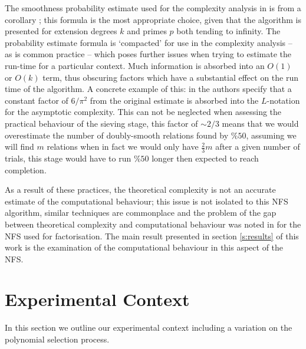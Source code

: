 \documentclass[a4paper, 10pt, envcountsect, runningheads]{lms}
\numberwithin{figure}{section}
\numberwithin{equation}{section}
\begin{document}
The smoothness probability estimate used for the complexity analysis in \cite{joux-lercier-smart-vercauteren06} is from a corollary \cite[page 15]{can-er-pom}; this formula is the most appropriate choice, given that the algorithm is presented for extension degrees $k$ and primes $p$ both tending to infinity. The probability estimate formula is `compacted' for use in the complexity analysis -- as is common practice -- which poses further issues when trying to estimate the run-time for a particular context. Much information is absorbed into an $O(1)$ or $O(k)$ term, thus obscuring factors which have a substantial effect on the run time of the algorithm. A concrete example of this: in \cite{joux-lercier-smart-vercauteren06} the authors specify that a constant factor of $6/\pi^2$ from the original estimate is absorbed into the $L$-notation for the asymptotic complexity. This can not be neglected when assessing the practical behaviour of the sieving stage, this factor of $\sim 2/3$ means that we would overestimate the number of doubly-smooth relations found by $\% 50$, assuming we will find $m$ relations when in fact we would only have $\frac{2}{3}m$ after a given number of trials, this stage would have to run $\% 50$ longer then expected to reach completion.

As a result of these practices, the theoretical complexity is not an accurate estimate of the computational behaviour; this issue is not isolated to this NFS algorithm, similar techniques are commonplace and the problem of the gap between theoretical complexity and computational behaviour was noted in \cite{dan_predicting_nfs} for the NFS used for factorisation. The main result presented in section \ref{s:results} of this work is the examination of the computational behaviour in this aspect of the NFS.
\section{Experimental Context}
\label{s:context}
In this section we outline our experimental context including a variation on the polynomial selection process. 
\end{document}
